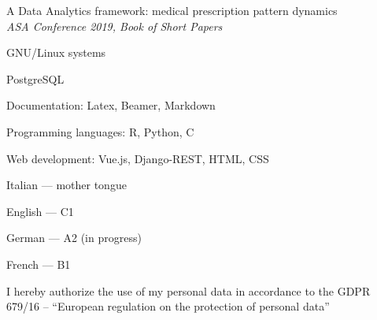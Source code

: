 
A Data Analytics framework: medical prescription pattern dynamics \\
\textit{ASA Conference 2019, Book of Short Papers}



\divider


\divider


\divider


\medskip


GNU/Linux systems

\divider

PostgreSQL

\divider

Documentation: Latex, Beamer, Markdown

\divider

Programming languages: R, Python, C

\divider

Web development: Vue.js, Django-REST, HTML, CSS

\medskip


Italian --- mother tongue

\divider

English --- C1

\divider

German --- A2 (in progress)

\divider

French --- B1

\medskip

\cvsection{ }
I hereby authorize the use of my personal data in accordance to the GDPR 679/16 – “European regulation on the protection of personal data”